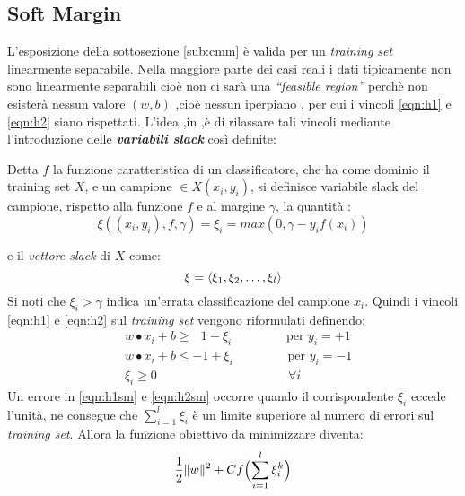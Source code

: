 \subsection{Soft Margin}
\label{sub:softmargin}
L'esposizione della sottosezione \ref{sub:cmm} è valida per un \textit{training set} linearmente separabile. Nella maggiore parte dei casi reali i dati tipicamente non sono linearmente separabili cioè non ci sarà una \textit{``feasible region''} perchè non esisterà nessun valore $(w,b)$ ,cioè nessun iperpiano , per cui i vincoli \ref{eqn:h1} e \ref{eqn:h2} siano rispettati. L'idea ,in \cite{Cortes95},è di rilassare tali vincoli  mediante l'introduzione delle \textit{\textbf{variabili slack}} così definite:
\begin{definizione*}
Detta $f$ la funzione caratteristica di un classificatore, che ha come dominio il training set $X$, e un campione $\in X (x_i , y_i)$, si definisce variabile slack del campione, rispetto alla funzione $f$ e al margine $\gamma$, la quantità :
\begin{equation*}
\xi((x_i , y_i) , f , \gamma  ) = \xi_{i} = max(0 , \gamma - y_if(x_i))
\end{equation*}
\end{definizione*}
e il \textit{vettore slack} di $X$ come:
\[ 
\xi = \Braket{\xi_1,\xi_2,\dots,\xi_l}
\] 
Si noti che $\xi_i > \gamma$ indica un'errata classificazione del campione $x_i$.
Quindi i vincoli \ref{eqn:h1} e \ref{eqn:h2} sul \textit{training set} vengono riformulati definendo:
\begin{align}
&w \bullet x_i + b \geq \:\:\:1-\xi_i \qquad \qquad\text{ per } y_i = +1 \label{eqn:h1sm}\\
&w \bullet x_i + b \leq -1+\xi_i \qquad \qquad\text{ per } y_i = -1  \label{eqn:h2sm}\\
&\xi_i \geq 0 \quad \qquad \qquad \qquad \qquad \quad\:\: \forall i \label{eqn:slack}
\end{align}
Un errore in \eqref{eqn:h1sm} e \eqref{eqn:h2sm} occorre quando il corrispondente $\xi_i$ eccede l'unità, ne consegue che $\sum_{i=1}^{l}\xi_i$ è un limite superiore al numero di errori sul \textit{training set}. Allora la funzione obiettivo da minimizzare diventa:
\begin{equation}
\label{eq:softorig}
\frac{1}{2}\lVert w\rVert^2 + Cf\Bigl(\sum_{i=1}^{l}\xi_i^k\Bigl)
\end{equation}
